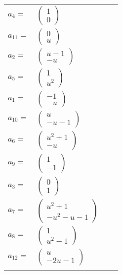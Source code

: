 \documentclass[1p]{elsarticle_modified}
\theoremstyle{definition}
\begin{document}
\begin{tabular}{m{7pt} m{180pt} m{7pt} m{180pt} }
\flushright $a_{4}=$&$\begin{pmatrix}1\\0\end{pmatrix}$ \\
\flushright $a_{11}=$&$\begin{pmatrix}0\\u\end{pmatrix}$ \\
\flushright $a_{2}=$&$\begin{pmatrix}u-1\\- u\end{pmatrix}$ \\
\flushright $a_{5}=$&$\begin{pmatrix}1\\u^2\end{pmatrix}$ \\
\flushright $a_{1}=$&$\begin{pmatrix}-1\\- u\end{pmatrix}$ \\
\flushright $a_{10}=$&$\begin{pmatrix}u\\- u-1\end{pmatrix}$ \\
\flushright $a_{6}=$&$\begin{pmatrix}u^2+1\\- u\end{pmatrix}$ \\
\flushright $a_{9}=$&$\begin{pmatrix}1\\-1\end{pmatrix}$ \\
\flushright $a_{3}=$&$\begin{pmatrix}0\\1\end{pmatrix}$ \\
\flushright $a_{7}=$&$\begin{pmatrix}u^2+1\\- u^2- u-1\end{pmatrix}$ \\
\flushright $a_{8}=$&$\begin{pmatrix}1\\u^2-1\end{pmatrix}$ \\
\flushright $a_{12}=$&$\begin{pmatrix}u\\-2 u-1\end{pmatrix}$\\&\end{tabular}
\end{document}
